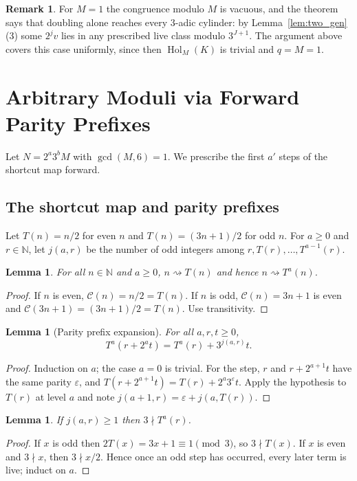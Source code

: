 \documentclass[11pt,reqno,oneside]{amsart}
\theoremstyle{plain}
\newtheorem{lemma}[theorem]{Lemma}
\theoremstyle{definition}
\newtheorem{remark}[theorem]{Remark}
\numberwithin{equation}{section}
\newcommand{\N}{\mathbb{N}}
\newcommand{\C}{\mathcal{C}}
\newcommand{\reaches}{\rightsquigarrow}
\DeclareMathOperator{\Hol}{Hol}
\begin{document}
\begin{remark}
For $M=1$ the congruence modulo $M$ is vacuous, and the theorem says that doubling alone reaches every $3$-adic cylinder: by Lemma~\ref{lem:two_gen}(3) some $2^jv$ lies in any prescribed live class modulo $3^{J+1}$. The argument above covers this case uniformly, since then $\Hol_M(K)$ is trivial and $q=M=1$.
\end{remark}

\section{Arbitrary Moduli via Forward Parity Prefixes}\label{sec:all}
Let $N=2^a3^bM$ with $\gcd(M,6)=1$. We prescribe the first $a'$ steps of the shortcut map forward.

\subsection*{The shortcut map and parity prefixes}
Let $T(n)=n/2$ for even $n$ and $T(n)=(3n+1)/2$ for odd $n$. For $a\ge0$ and $r\in\N$, let $j(a,r)$ be the number of odd integers among $r,T(r),\dots,T^{a-1}(r)$.

\begin{lemma}\label{lem:shortcut}
For all $n\in\N$ and $a\ge0$, $n\reaches T(n)$ and hence $n\reaches T^a(n)$.
\end{lemma}
\begin{proof}
If $n$ is even, $\C(n)=n/2=T(n)$. If $n$ is odd, $\C(n)=3n+1$ is even and $\C(3n+1)=(3n+1)/2=T(n)$. Use transitivity.
\end{proof}

\begin{lemma}[Parity prefix expansion]\label{lem:parity}
For all $a,r,t\ge0$,
\[
T^a(r+2^at)=T^a(r)+3^{j(a,r)}t .
\]
\end{lemma}
\begin{proof}
Induction on $a$; the case $a=0$ is trivial. For the step, $r$ and $r+2^{a+1}t$ have the same parity $\varepsilon$, and $T(r+2^{a+1}t)=T(r)+2^a3^{\varepsilon}t$. Apply the hypothesis to $T(r)$ at level $a$ and note $j(a+1,r)=\varepsilon+j(a,T(r))$.
\end{proof}

\begin{lemma}\label{lem:live_after_odd}
If $j(a,r)\ge1$ then $3\nmid T^a(r)$.
\end{lemma}
\begin{proof}
If $x$ is odd then $2T(x)=3x+1\equiv1\pmod3$, so $3\nmid T(x)$. If $x$ is even and $3\nmid x$, then $3\nmid x/2$. Hence once an odd step has occurred, every later term is live; induct on $a$.
\end{proof}
\end{document}
